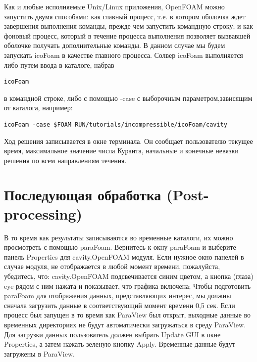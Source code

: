 Как и любые исполняемые Unix/Linux приложения, OpenFOAM можно запустить двумя способами: как главный процесс, т.е. в котором оболочка ждет завершения выполнения команды, прежде чем запустить командную строку; и как фоновый процесс, который в течение процесса выполнения позволяет вызвавшей оболочке получать дополнительные команды. 
В данном случае мы будем запускать icoFoam в качестве главного процесса. Солвер icoFoam выполняется либо путем ввода в каталоге, набрав

\begin{verbatim}
icoFoam 
\end{verbatim}

в командной строке, либо с помощью -case с выборочным параметром,зависящим от каталога, например:

\begin{verbatim}
icoFoam -case $FOAM RUN/tutorials/incompressible/icoFoam/cavity
\end{verbatim}

Ход решения записывается в окне терминала. Он сообщает пользователю текущее время, максимальное значение числа Куранта, начальные и конечные невязки решения по всем направлениям течения.

\section{Последующая обработка (Post-processing)}
\label{sec:2.1.4}

В то время как результаты записываются во временные каталоги, их можно просмотреть с помощью paraFoam. Вернитесь к окну paraFoam и выберите панель Properties для cavity.OpenFOAM модуля. Если нужное окно панелей в случае модуля, не отображается в любой момент времени, пожалуйста, убедитесь, что: cavity.OpenFOAM подсвечивается синим цветом, а кнопка (глаза) eye рядом с ним нажата и показывает, что графика включена;
Чтобы подготовить paraFoam для отображения данных, представляющих интерес, мы должны сначала загрузить данные в соответствующий момент времени 0,5 сек. Если процесс был запущен в то время как ParaView был открыт, выходные данные во временных директориях не будут автоматически загружаться в среду ParaView. Для загрузки данных пользователь должен выбрать Update GUI в окне Properties, а затем нажать зеленую кнопку Apply. Временные данные будут загружены в ParaView.

\begin{figure}[ht]
\end{figure}

